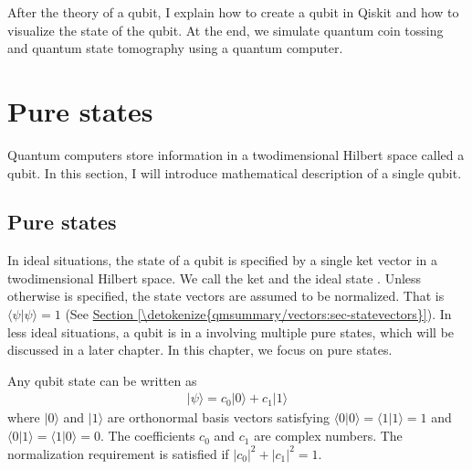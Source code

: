 \documentclass[letterpaper,10pt,english]{jupyterBook}
\begin{document}
\sphinxAtStartPar
After the theory of a qubit, I explain how to create a qubit in Qiskit and how to visualize the state of the qubit.  At the end, we simulate quantum coin tossing and quantum state tomography using a quantum computer.

\sphinxstepscope


\section{Pure states}
\label{\detokenize{qubit/purestates:pure-states}}\label{\detokenize{qubit/purestates:sec-purestates}}\label{\detokenize{qubit/purestates::doc}}
\sphinxAtStartPar
Quantum computers store information in a two\sphinxhyphen{}dimensional Hilbert space called a qubit.   In this section, I will introduce mathematical description of a single qubit.


\subsection{Pure states}
\label{\detokenize{qubit/purestates:id1}}
\sphinxAtStartPar
In ideal situations, the state of a qubit is specified by a single ket vector in a two\sphinxhyphen{}dimensional Hilbert space.  We call the ket  and the ideal state .  Unless otherwise is specified, the state vectors are assumed to be normalized. That is \(\langle \psi | \psi \rangle = 1\) (See \hyperref[\detokenize{qmsummary/vectors:sec-statevectors}]{Section \ref{\detokenize{qmsummary/vectors:sec-statevectors}}}).
In less ideal situations, a qubit is in a  involving multiple pure states, which will be discussed in a later chapter.  In this chapter, we focus on pure states.

\sphinxAtStartPar
Any qubit state can be written as
\begin{equation}\label{equation:qubit/purestates:qubit-purestate}
\begin{split}
| \psi \rangle = c_0 | 0 \rangle + c_1 | 1 \rangle
\end{split}
\end{equation}
\sphinxAtStartPar
where \(| 0 \rangle \) and \(| 1 \rangle\) are orthonormal basis vectors satisfying \(\langle 0 | 0 \rangle = \langle 1 | 1 \rangle = 1\) and \(\langle 0 | 1 \rangle = \langle 1 | 0 \rangle = 0\).  The coefficients \(c_0\) and \(c_1\) are complex numbers. The normalization requirement is satisfied if \(|c_0|^2 + |c_1|^2 = 1\).
\end{document}
